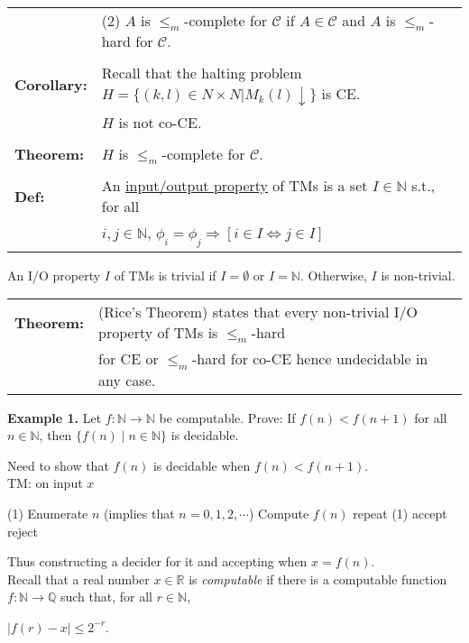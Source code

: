 \documentclass[11pt]{article}
\begin{document}
\begin{longtable}{ll}
& (2) $A$ is $\leqslant_m$-complete for $\mathcal{C}$ if $A \in \mathcal{C}$ and $A$ is $\leqslant_m$-hard for $\mathcal{C}$. \\
\\
{\bf Corollary:} & Recall that the halting problem $H=\{(k,l)\in N\times N|M_k(l)\downarrow\}$ is CE. \\
& $H$ is not co-CE. \\
\\
{\bf Theorem:} & $H$ is $\leqslant_m$-complete for $\mathcal{C}$. \\
\\
{\bf Def:} & An \underline{input/output property} of TMs is a set $I \in \mathbb{N}$ s.t., for all \\
& $i,j \in \mathbb{N}$, $\phi_i = \phi_j \Rightarrow [i\in I \Leftrightarrow j \in I]$ \\
\end{longtable}

An I/O property $I$ of TMs is trivial if $I = \emptyset$ or $I = \mathbb{N}$. Otherwise, $I$ is non-trivial. \\

\begin{tabular}{ll}
{\bf Theorem:} & (Rice's Theorem) states that every non-trivial I/O property of TMs is $\leqslant_m$-hard \\
& for CE or $\leqslant_m$-hard for co-CE hence undecidable in any case. 
\end{tabular}

\newpage

{\bf Example 1.} Let $f:\mathbb{N}\longrightarrow\mathbb{N}$ be computable. Prove: If $f(n)<f(n+1)$ for all $n\in\mathbb{N}$, then $\{f(n)\mid n\in\mathbb{N}\}$ is decidable.

Need to show that $f(n)$ is decidable when $f(n)<f(n+1)$. \\
TM: on input $x$
\begin{algorithmic}
\State (1) Enumerate $n$ (implies that $n=0,1,2,\cdots$)
\State Compute $f(n)$
\State repeat (1)
\State accept
\State reject
\EndIf
\end{algorithmic}
Thus constructing a decider for it and accepting when $x=f(n)$. \\

Recall that a real number $x\in\mathbb{R}$ is \emph{computable} if there is a computable function $f:\mathbb{N}\longrightarrow\mathbb{Q}$ such that, for all $r\in\mathbb{N}$,
\begin{center}
    $|f(r)-x|\leq 2^{-r}$.
\end{center}
\end{document}
